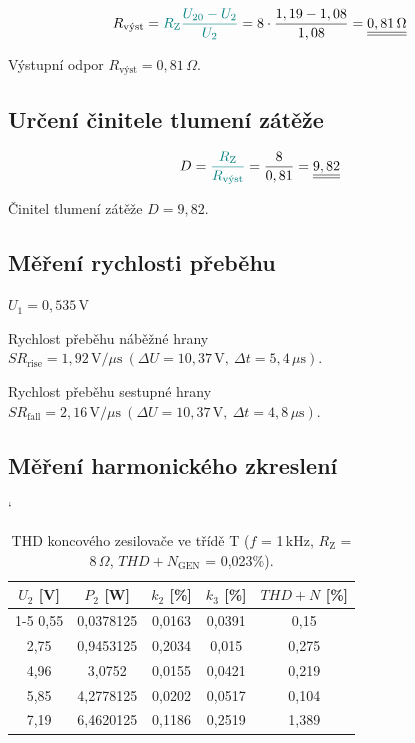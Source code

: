 \documentclass[a4paper, czech]{article}
\begin{document}
\begin{equation}
    R_\text{výst} = \textcolor{teal}{R_\text{Z} \frac{U_{20} - U_2}{U_2}} = 8 \cdot \frac{1,19 - 1,08}{1,08} = \underline{\underline{0,81\,\Omega}}
\end{equation}

Výstupní odpor $R_\text{výst} = 0,81\,\Omega$.

\subsection{Určení činitele tlumení zátěže}

\begin{equation}
    D = \textcolor{teal}{\frac{R_\text{Z}}{R_\text{výst}}} = \frac{8}{0,81} = \underline{\underline{9,82}}
\end{equation}

Činitel tlumení zátěže $D = 9,82$.

\subsection{Měření rychlosti přeběhu}

$U_1 = 0,535\,\text{V}$

Rychlost přeběhu náběžné hrany $SR_\text{rise} = 1,92\,\text{V/}\mu\text{s}\ (\Delta U = 10,37\,\text{V},\ \Delta t = 5,4\,\mu\text{s}).$

Rychlost přeběhu sestupné hrany $SR_\text{fall} = 2,16\,\text{V/}\mu\text{s}\ (\Delta U = 10,37\,\text{V},\ \Delta t = 4,8\,\mu\text{s}).$


\subsection{Měření harmonického zkreslení}

\begin{table}[H]
    \catcode`
    \centering
    \caption{THD koncového zesilovače ve třídě T ($f$ = 1\,kHz, $R_\text{Z}$ = 8\,$\Omega$, $THD+N_\text{GEN}$ = 0,023\%).}
    \begin{tabular}{ccccc}
        \toprule
        $U_2$ [V] & $P_2$ [W] & $k_2$ [\%] & $k_3$ [\%] & $THD+N$ [\%] \\
        \cmidrule(rl){1-5}
        0,55   & 0,0378125 & 0,0163  & 0,0391  & 0,15       \\
        2,75   & 0,9453125 & 0,2034  & 0,015   & 0,275      \\
        4,96   & 3,0752    & 0,0155  & 0,0421  & 0,219      \\
        5,85   & 4,2778125 & 0,0202  & 0,0517  & 0,104      \\
        7,19   & 6,4620125 & 0,1186  & 0,2519  & 1,389      \\
        \bottomrule
    \end{tabular}
\end{table}
\end{document}
